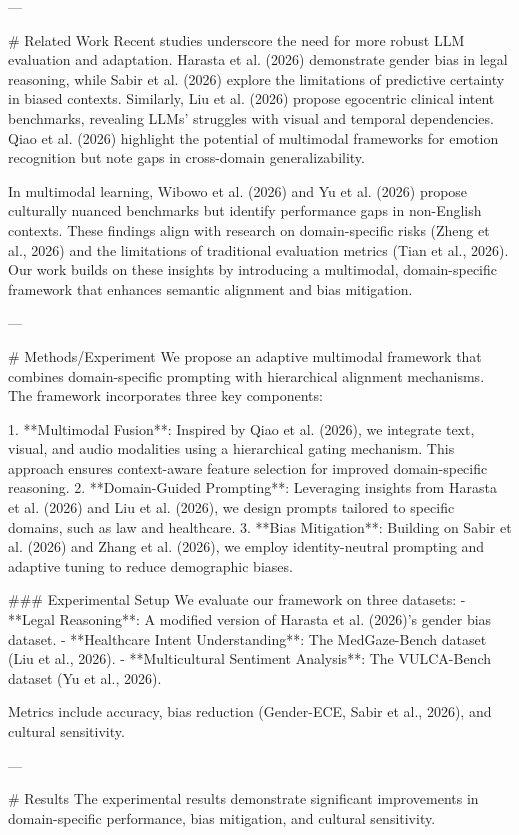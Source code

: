 ---

# Related Work  
Recent studies underscore the need for more robust LLM evaluation and adaptation. Harasta et al. (2026) demonstrate gender bias in legal reasoning, while Sabir et al. (2026) explore the limitations of predictive certainty in biased contexts. Similarly, Liu et al. (2026) propose egocentric clinical intent benchmarks, revealing LLMs' struggles with visual and temporal dependencies. Qiao et al. (2026) highlight the potential of multimodal frameworks for emotion recognition but note gaps in cross-domain generalizability.

In multimodal learning, Wibowo et al. (2026) and Yu et al. (2026) propose culturally nuanced benchmarks but identify performance gaps in non-English contexts. These findings align with research on domain-specific risks (Zheng et al., 2026) and the limitations of traditional evaluation metrics (Tian et al., 2026). Our work builds on these insights by introducing a multimodal, domain-specific framework that enhances semantic alignment and bias mitigation.

---

# Methods/Experiment  
We propose an adaptive multimodal framework that combines domain-specific prompting with hierarchical alignment mechanisms. The framework incorporates three key components:

1. **Multimodal Fusion**: Inspired by Qiao et al. (2026), we integrate text, visual, and audio modalities using a hierarchical gating mechanism. This approach ensures context-aware feature selection for improved domain-specific reasoning.
2. **Domain-Guided Prompting**: Leveraging insights from Harasta et al. (2026) and Liu et al. (2026), we design prompts tailored to specific domains, such as law and healthcare.
3. **Bias Mitigation**: Building on Sabir et al. (2026) and Zhang et al. (2026), we employ identity-neutral prompting and adaptive tuning to reduce demographic biases.

### Experimental Setup  
We evaluate our framework on three datasets:
- **Legal Reasoning**: A modified version of Harasta et al. (2026)'s gender bias dataset.
- **Healthcare Intent Understanding**: The MedGaze-Bench dataset (Liu et al., 2026).
- **Multicultural Sentiment Analysis**: The VULCA-Bench dataset (Yu et al., 2026).

Metrics include accuracy, bias reduction (Gender-ECE, Sabir et al., 2026), and cultural sensitivity.

---

# Results  
The experimental results demonstrate significant improvements in domain-specific performance, bias mitigation, and cultural sensitivity.

